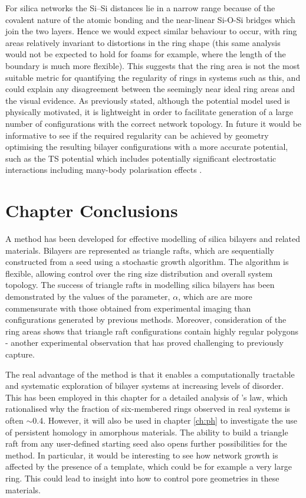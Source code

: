 For silica networks the Si\---Si distances lie in a narrow range because of the covalent nature of the atomic bonding and the near-linear Si-O-Si bridges
which join the two layers. 
Hence we would expect similar behaviour to occur, with ring areas relatively invariant to distortions in the ring shape (this same analysis would not be expected to hold for foams for example, where the length of the boundary is much more flexible). 
This suggests that the ring area is not the most suitable metric for quantifying the regularity of rings in systems such as this, and could explain any disagreement between the seemingly near ideal ring areas and the visual evidence. 
As previously stated, although the potential model used is physically motivated, it is lightweight in order to facilitate generation of a large number of configurations with the correct network topology. 
In future it would be informative to see if the required regularity can be achieved by geometry optimising the resulting bilayer configurations with a more accurate potential, such as the TS potential which includes potentially significant electrostatic interactions including many-body polarisation effects \cite{Tangney2002}.

\section{Chapter Conclusions}

A method has been developed for effective modelling of silica bilayers and related materials.
Bilayers are represented as triangle rafts, which are sequentially constructed from a seed using a stochastic growth algorithm.
The algorithm is flexible, allowing control over the ring size distribution and overall system topology.
The success of triangle rafts in modelling silica bilayers has been demonstrated by the values of the \aw{} parameter, $\alpha$, which are are more commensurate with those obtained from experimental imaging than configurations generated by previous methods.
Moreover, consideration of the ring areas shows that triangle raft configurations contain highly regular polygons - another experimental observation that has proved challenging to previously capture.

The real advantage of the method is that it enables a computationally tractable and systematic exploration of bilayer systems at increasing levels of disorder.
This has been employed in this chapter for a detailed analysis of \lm's
law, which rationalised why the fraction of six-membered rings observed
in real systems is often $\sim$0.4. 
However, it will also be used in chapter \ref{ch:ph} to investigate the use of persistent homology in amorphous materials.
The ability to build a triangle raft from any user\--defined starting seed also opens further possibilities for the method.
In particular, it would be interesting to see how network growth is affected by the presence of a template, which could be for example a very large ring.
This could lead to insight into how to control pore geometries in these materials.




